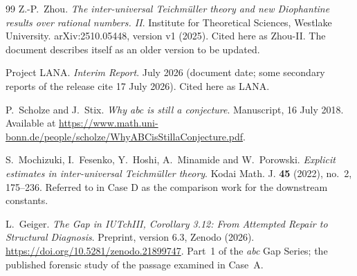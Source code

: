 \documentclass[11pt,a4paper]{article}
\theoremstyle{definition}
\begin{document}
\begin{thebibliography}{99}
Z.-P.~Zhou.
\newblock \emph{The inter-universal Teichmüller theory and new Diophantine
results over rational numbers. II}.
\newblock Institute for Theoretical Sciences, Westlake University.
\newblock arXiv:2510.05448, version v1 (2025). Cited here as Zhou-II. The
document describes itself as an older version to be updated.

Project LANA.
\newblock \emph{Interim Report}.
 July 2026 (document date; some secondary reports of the release
cite 17 July 2026). Cited here as LANA.

P.~Scholze and J.~Stix.
\newblock \emph{Why abc is still a conjecture}.
\newblock Manuscript, 16 July 2018. Available at
\url{https://www.math.uni-bonn.de/people/scholze/WhyABCisStillaConjecture.pdf}.

S.~Mochizuki, I.~Fesenko, Y.~Hoshi, A.~Minamide and W.~Porowski.
\newblock \emph{Explicit estimates in inter-universal Teichmüller theory}.
\newblock Kodai Math. J. \textbf{45} (2022), no.~2, 175--236.
\newblock Referred to in Case D as the comparison work for the downstream
constants.

L.~Geiger.
\newblock \emph{The Gap in IUTchIII, Corollary 3.12: From Attempted Repair to
Structural Diagnosis}.
\newblock Preprint, version 6.3, Zenodo (2026).
\newblock \url{https://doi.org/10.5281/zenodo.21899747}.
\newblock Part~1 of the \emph{abc} Gap Series; the published forensic study of the
passage examined in Case~A.


\end{thebibliography}
\end{document}
